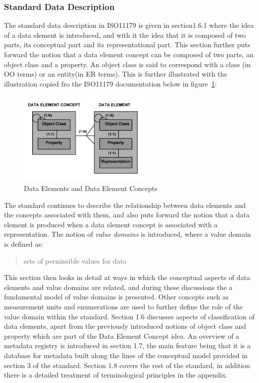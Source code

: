 \documentclass{llncs}
\begin{document}
\subsubsection{Standard Data Description}

The standard data description in ISO11179 is given in section1.6.1 where the idea of a data element is introduced, and with it the idea that it is composed of two parts, its conceptual part and its representational part. This section further puts forward the notion that a data element concept can be composed of two parts, an object class and a property. An object class is said to correspond with a class (in OO terms) or an entity(in ER terms). This is further illustrated with the illustration copied fro the ISO11179 documentation below in figure~\ref{fig:DEC}:

\begin{figure}[h]
\includegraphics[width=0.6\textwidth,natwidth=610,natheight=642]{DataElementConcept}
\caption{Data Elements and Data Element Concepts} 
\label{fig:DEC}
\end{figure}

The standard continues to describe the relationship between data elements and the concepts associated with them, and also puts forward the notion that a data element is produced when a data element concept is associated with a representation. The notion of \emph{value domains} is introduced, where a value domain is defined as:

\begin{quotation} {sets of permissible values for data} \end{quotation}

This section then looks in detail at ways in which the conceptual aspects of data elements and value domains are related, and during these discussions the a fundamental model of value domains is presented. Other concepts such as measurement units and enumerations are used to further define the role of the value domain within the standard. Section 1.6 discusses aspects of classification of data elements, apart from the previously introduced notions of object class and property which are part of the Data Element Concept idea. An overview of a metadata registry is introduced in section 1.7, the main feature being that it is a database for metadata built along the lines of the conceptual model provided in section 3 of the standard. Section 1.8 covers the rest of the standard, in addition there is a detailed treatment of terminological principles in the appendix.
\end{document}
